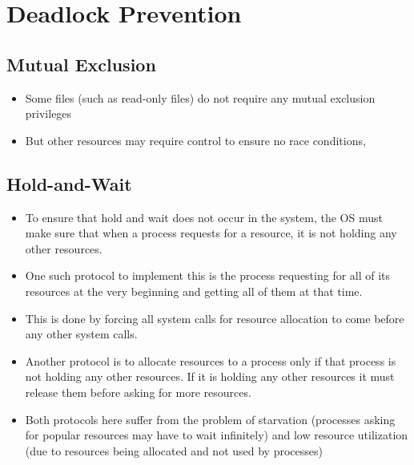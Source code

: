 \documentclass{article}
\theoremstyle{plain}
\theoremstyle{definition}
\begin{document}
\section{Deadlock Prevention}
\subsection{Mutual Exclusion}
\begin{itemize}
    \item Some files (such as read-only files) do not require any mutual exclusion privileges
    
    \item But other resources may require control to ensure no race conditions, 
\end{itemize}

\subsection{Hold-and-Wait}
\begin{itemize}
    \item To ensure that hold and wait does not occur in the system, the OS must make sure that when a process requests for a resource, it is not holding any other resources. 
    
    \item One such protocol to implement this is the process requesting for all of its resources at the very beginning and getting all of them at that time. 
    
    \item This is done by forcing all system calls for resource allocation to come before any other system calls.
    
    \item Another protocol is to allocate resources to a process only if that process is not holding any other resources. If it is holding any other resources it must release them before asking for more resources.
    
    \item Both protocols here suffer from the problem of starvation (processes asking for popular resources may have to wait infinitely) and low resource utilization (due to resources being allocated and not used by processes)
\end{itemize}
\end{document}
